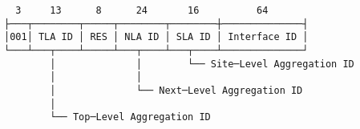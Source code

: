 \documentclass[varwidth=30cm,crop]{standalone}
\begin{document}
\begin{verbatim}
  3     13      8      24       16          64      
├───┬────────┬─────┬────────┬────────┼──────────────┤
│001│ TLA ID │ RES │ NLA ID │ SLA ID │ Interface ID │
└───┴───┬────┴─────┴───┬────┴───┬────┴──────────────┘
        │              │        └── Site─Level Aggregation ID
        │              │
        │              └── Next─Level Aggregation ID
        │
        └── Top─Level Aggregation ID
\end{verbatim}
\end{document}
